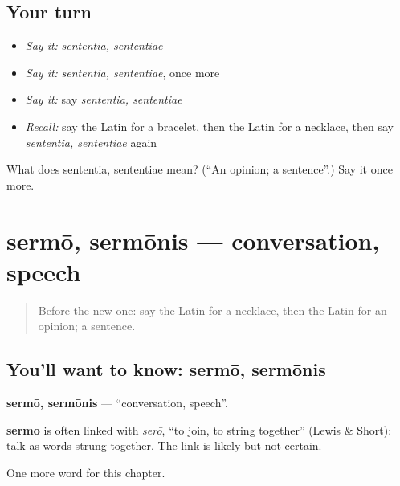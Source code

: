 \subsection*{Your turn}
\begin{itemize}
\raggedright
  \item \emph{Say it:} \emph{sententia, sententiae}
  \item \emph{Say it:} \emph{sententia, sententiae}, once more
  \item \emph{Say it:} say \emph{sententia, sententiae}
  \item \emph{Recall:} say the Latin for a bracelet, then the Latin for a necklace, then say \emph{sententia, sententiae} again
\end{itemize}

\begin{tcolorbox}[breakable,colback=teal!4,colframe=teal!35!black,title={Before you move on}]
What does sententia, sententiae mean? (\textquotedblleft{}An opinion; a sentence\textquotedblright{}.) Say it once more.
\end{tcolorbox}
\section[sermō, sermōnis]{sermō, sermōnis — conversation, speech}

\label{lesson:LA-C194-sermo}



\begin{quote}
Before the new one: say the Latin for a necklace, then the Latin for an opinion; a sentence.
\end{quote}

\subsection*{You'll want to know: sermō, sermōnis}
\textbf{sermō, sermōnis} — \textquotedblleft{}conversation, speech\textquotedblright{}.

\begin{cousinweb}
\textbf{sermō} is often linked with \emph{serō}, \textquotedblleft{}to join, to string together\textquotedblright{} (Lewis \& Short): talk as words strung together. The link is likely but not certain.
\end{cousinweb}

\begin{grammarlens}[title={What you've built}]
One more word for this chapter.
\end{grammarlens}

